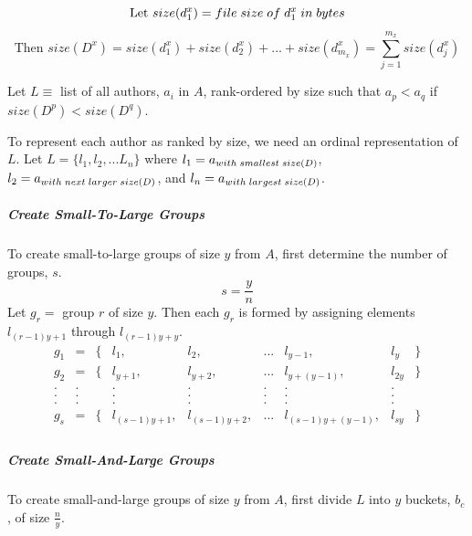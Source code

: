 	\begin{equation} \text{Let } size(d_1^x) = file \thickspace size \thickspace of \thickspace d_1^x \thickspace in \thickspace bytes\end{equation} 
	\begin{equation} \text{Then } size(D^x) = size(d_1^x) + size(d_2^x) + ... + size(d_{m_x}^x) = \sum_{j=1}^{m_x} size(d_j^x)\end{equation}
	
	Let $L \equiv$ list of all authors, $a_i$ in $A$, rank-ordered by size such that $a_p < a_q$ if $size(D^p) < size(D^q)$.
	
	To represent each author as ranked by size, we need an ordinal representation of $L$. Let $L = \{ l_1, l_2, ... L_n \}$ where $l_1=a_{with \thickspace smallest \thickspace size(D)}$, $l_2=a_{with \thickspace next \thickspace larger \thickspace size(D)}$, and $l_n = a_{with \thickspace largest \thickspace size(D)}$.
	
	\subparagraph{Create Small-To-Large Groups}
	To create small-to-large groups of size $y$ from $A$, first determine the number of groups, $s$.
	\begin{equation} s=\frac{y}{n}\end{equation}
	Let $g_r=$ group $r$ of size $y$.  Then each $g_r$ is formed by assigning elements $l_{(r-1)y+1}$ through $l_{(r-1)y+y}$.
	\begin{equation}
	\begin{array}{lcllrlcllr}
	g_1	& =	& \{ &	l_1,		& l_2,		& ...	& l_{y-1},		& l_y 		& \}	\\
	g_2	& =	& \{ &	l_{y+1},	& l_{y+2},	& ...	& l_{y+(y-1)},		& l_{2y}	& \}	\\
	.	& .	&    &	.		& .		& .	& .			& .		& \\
	.	& .	&    &	.		& .		& .	& .			& .		& \\
	.	& .	&    &	.		& .		& .	& .			& .		& \\
	g_s	& =	& \{ & 	l_{(s-1)y+1},	& l_{(s-1)y+2},	& ...	& l_{(s-1)y+(y-1)},	& l_{sy} 	& \}	\\
	\end{array}
	\end{equation}
		
	\subparagraph{Create Small-And-Large Groups}
	To create small-and-large groups of size $y$ from $A$, first divide $L$ into $y$ buckets, $b_c$, of size $\frac{n}{y}$.
	

